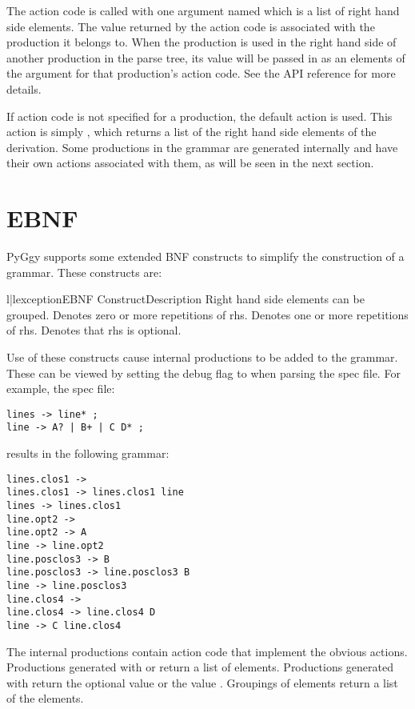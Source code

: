 The action code
is called with one argument named  which is a list of
right hand side elements.  The value returned by the action code is
associated with the production it belongs to.  When the production
is used in the right hand side of another production in the parse
tree, its value will be passed in as an elements of the 
argument for that production's action code.
See the API reference for more details.

If action code is not specified for a production, the default
action is used.  This action is simply , which
returns a list of the right hand side elements of the derivation.
Some productions in the grammar are generated internally and have
their own actions associated with them, as will be seen in the next
section.

\section{EBNF}
PyGgy supports some extended BNF constructs to simplify the construction
of a grammar.  These constructs are:

\begin{tableii}{l|l}{exception}{EBNF Construct}{Description}
   {Right hand side elements can be grouped.}
     {Denotes zero or more repetitions of rhs.}
     {Denotes one or more repetitions of rhs.}
     {Denotes that rhs is optional.}
\end{tableii}

Use of these constructs cause internal productions to be added
to the grammar.  These can be viewed by setting the debug flag to
 when parsing the spec file.
For example, the spec file:

\begin{verbatim}
lines -> line* ;
line -> A? | B+ | C D* ;
\end{verbatim}

results in the following grammar:

\begin{verbatim}
lines.clos1 ->
lines.clos1 -> lines.clos1 line
lines -> lines.clos1
line.opt2 ->
line.opt2 -> A
line -> line.opt2
line.posclos3 -> B
line.posclos3 -> line.posclos3 B
line -> line.posclos3
line.clos4 ->
line.clos4 -> line.clos4 D
line -> C line.clos4
\end{verbatim}


The internal productions contain action code that implement the 
obvious actions.  Productions generated with  or 
return a list of elements.  Productions generated with 
return the optional value or the value .  Groupings of
elements return a list of the elements.



